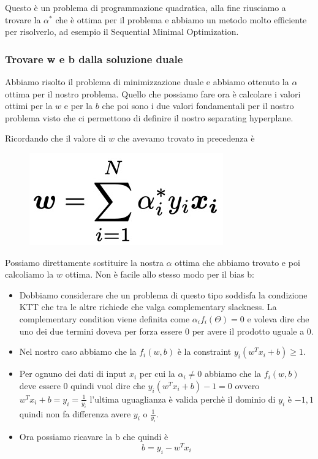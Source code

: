 \documentclass[14pt]{extreport}
\begin{document}
Questo è un problema di programmazione quadratica, alla fine riusciamo a trovare la $\alpha^*$ che è ottima per il problema e abbiamo un metodo molto
efficiente per risolverlo, ad esempio il Sequential Minimal Optimization.

\subsubsection{Trovare w e b dalla soluzione duale}

Abbiamo risolto il problema di minimizzazione duale e abbiamo ottenuto la $\alpha$ ottima per il nostro problema. Quello che possiamo fare ora è
calcolare i valori ottimi per la $w$ e per la $b$ che poi sono i due valori fondamentali per il nostro problema visto che ci permettono di definire il
nostro separating hyperplane.

Ricordando che il valore di $w$ che avevamo trovato in precedenza è \begin{figure}[H]
\centering
\includegraphics[width=0.2\linewidth]{319.jpeg}
\end{figure}

Possiamo direttamente sostituire la nostra $\alpha$ ottima che abbiamo trovato e poi calcoliamo la $w$ ottima. Non è facile allo stesso modo per il
bias b:
\begin{itemize}
\item Dobbiamo considerare che un problema di questo tipo soddisfa la condizione KTT che tra le altre richiede che valga complementary slackness. La
complementary condition viene definita come $\alpha_i f_i(\Theta) = 0$ e voleva dire che uno dei due termini doveva per forza essere 0 per avere il
prodotto uguale a 0.
\item Nel nostro caso abbiamo che la $f_i(w,b)$ è la constraint $y_i(w^Tx_i+b) \geq 1$.
\item Per ognuno dei dati di input $x_i$ per cui la $\alpha_i \not = 0$ abbiamo che la $f_i(w,b)$ deve essere 0 quindi vuol dire che $y_i(w^Tx_i+b) -
1=0$ ovvero $w^Tx_i+b = y_i = \frac{1}{y_i}$ l'ultima uguaglianza è valida perchè il dominio di $y_i$ è ${-1,1}$ quindi non fa differenza avere $y_i$
o $\frac{1}{y_i}$.
\item Ora possiamo ricavare la b che quindi è $$b = y_i-w^T x_i$$
\end{itemize}
\end{document}
